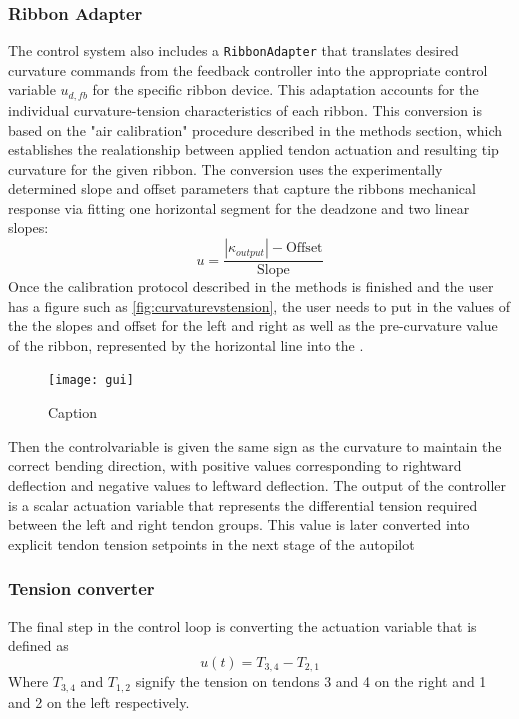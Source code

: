 \subsubsection{Ribbon Adapter}
The control system also includes a \texttt{RibbonAdapter} that translates desired curvature commands from the feedback controller into the appropriate control variable \(u_{d,fb}\) for the specific ribbon device. This adaptation accounts for the individual curvature-tension characteristics of each ribbon. This conversion is based on the "air calibration" procedure described in the methods section, which establishes the realationship between applied tendon actuation and resulting tip curvature for the given ribbon. The conversion uses the experimentally determined slope and offset parameters that capture the ribbons mechanical response via fitting one horizontal segment for the deadzone and two linear slopes:
\begin{equation}
u = \frac{|\kappa_{output}| - \text{Offset}}{\text{Slope}}
\end{equation}
Once the calibration protocol described in the methods is finished and the user has a figure such as \ref{fig:curvaturevstension}, the user needs to put in the values of the the slopes and offset for the left and right as well as the pre-curvature value of the ribbon, represented by the horizontal line into the . 
\begin{figure}
    \centering
    \texttt{[image: gui]}
    \caption{Caption}
    \label{fig:enter-label}
\end{figure}


Then the controlvariable is given the same sign as the curvature to maintain the correct bending direction, with positive values corresponding to rightward deflection and negative values to leftward deflection.
\newline \newline
The output of the controller is a scalar actuation variable that represents the differential tension required between the left and right tendon groups. This value is later converted into explicit tendon tension setpoints in the next stage of the autopilot


\subsubsection{Tension converter}
The final step in the control loop is converting the actuation variable that is defined as 
\begin{equation}
    u(t) = T_{3, 4} - T_{2,1}
\end{equation}
Where \(T_{3, 4}\) and \(T_{1, 2}\) signify the tension on tendons 3 and 4 on the right and 1 and 2 on the left respectively.

